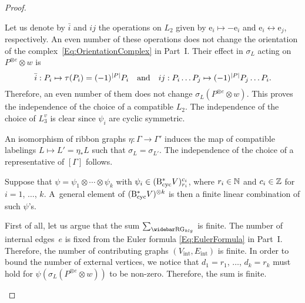 \documentclass[\MainFolder/Text.tex]{subfiles}
\begin{document}
\begin{proof}
\begin{ProofList}
\item Let us denote by $\bar{i}$ and $ij$ the operations on $L_2$ given by $\mathrm{e}_i \mapsto -\mathrm{e}_i$ and $\mathrm{e}_i \leftrightarrow \mathrm{e}_j$, respectively. An even number of these operations does not change the orientation of the complex~\eqref{Eq:OrientationComplex} in Part~I. Their effect in $\sigma_L$ acting on $P^{\otimes e}\otimes w$ is
\begin{equation*}
\bar{i}: P_i\mapsto \tau(P_i) = (-1)^{|P|} P_i\quad\text{and}\quad ij: P_i \dots P_j\mapsto (-1)^{|P|} P_j \dots P_i.
\end{equation*}
Therefore, an even number of them does not change $\sigma_L(P^{\otimes e}\otimes w)$. This proves the independence of the choice of a compatible $L_2$. The independence of the choice of $L_{3}^v$ is clear since $\psi_i$ are cyclic symmetric.

An isomorphism of ribbon graphs $\eta: \Gamma \rightarrow \Gamma'$ induces the map of compatible labelings $L \mapsto L' = \eta_* L$ such that $\sigma_{L} = \sigma_{L'}$. The independence of the choice of a representative of $[\Gamma]$ follows.

\item Suppose that $\psi = \psi_1 \otimes \dotsb \otimes \psi_k$ with $\psi_i \in (\mathrm{B}_{\mathrm{cyc}}^* V)_{r_i}^{c_i}$, where $r_i\in \mathbb{N}$ and $c_i \in \mathbb{Z}$ for $i=1$, $\dotsc$, $k$. A~general element of $(\mathrm{B}_{\mathrm{cyc}}^* V)^{\otimes k}$ is then a finite linear combination of such $\psi$'s. 

First of all, let us argue that the sum $\sum_{\RRG_{klg}}$ is finite. The number of internal edges~$e$ is fixed from the Euler formula \eqref{Eq:EulerFormula} in Part~I. Therefore, the number of contributing graphs $(V_{\mathrm{int}}, E_{\mathrm{int}})$ is finite. In order to bound the number of external vertices, we notice that $d_1 = r_1$, $\dotsc$, $d_k = r_k$ must hold for $\psi(\sigma_L(P^{\otimes e}\otimes w))$ to be non-zero. Therefore, the sum is finite.


\end{ProofList}
\end{proof}
\end{document}
